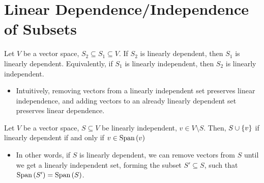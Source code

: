 \documentclass[letterpaper,12pt]{article}
\begin{document}
\section*{Linear Dependence/Independence of Subsets}
\begin{theorem}
Let $V$ be a vector space, $S_2 \subseteq S_1 \subseteq V$. If $S_2$ is linearly dependent, then $S_1$ is linearly dependent. Equivalently, if $S_1$ is linearly independent, then $S_2$ is linearly independent.
\begin{itemize}
    \item Intuitively, removing vectors from a linearly independent set preserves linear independence, and adding vectors to an already linearly dependent set preserves linear dependence.
\end{itemize}
\end{theorem}

\begin{theorem}
Let $V$ be a vector space, $S \subseteq V$ be linearly independent, $v \in V \setminus S$. Then, $S \cup \left\{ v \right\}$ if linearly dependent if and only if $v \in \text{Span}\left(v \right)$
\begin{itemize}
    \item In other words, if $S$ is linearly dependent, we can remove vectors from $S$ until we get a linearly independent set, forming the subset $S' \subseteq S$, such that $\text{Span}\left(S' \right) = \text{Span}\left(S \right)$.
\end{itemize}
\end{theorem}
\end{document}
